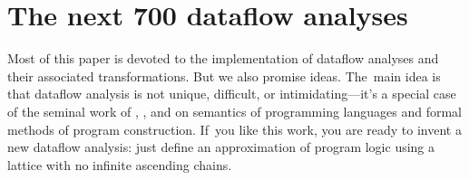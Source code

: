 \documentclass[blockstyle,preprint,natbib,nocopyrightspace]{sigplanconf}
\newcommand{\authornote}[1]{{\em #1}}
\def\authornote#1{\unskip\relax}
\newcommand{\simon}[1]{\authornote{SLPJ: #1}}
\newcommand{\norman}[1]{\authornote{NR: #1}}
\let\remark\norman
\newcommand\seclabel[1]{\label{sec:#1}}
\begin{document}
\section{The next 700 dataflow analyses}

\seclabel{logic}
\seclabel{next-700}



Most of this paper is devoted to the implementation of dataflow
analyses and their associated transformations.
But we also promise ideas.
The~main idea is that dataflow analysis is not unique,
difficult, or intimidating---it's a special case of 
the seminal work of
\citet{floyd:assigning-meanings},
\citet{hoare:axiomatic-basis},
and
\citet{dijkstra:discipline}
on semantics of programming languages and
 formal methods of program construction.
If~you like this work, you are ready to invent a new
dataflow analysis:
just define an approximation of program logic
using a lattice with no infinite ascending chains.
\end{document}
